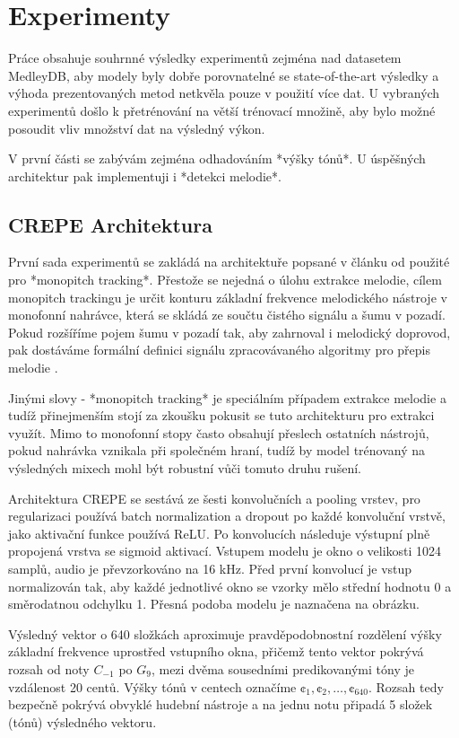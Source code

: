\chapter{Experimenty}

Práce obsahuje souhrnné výsledky experimentů zejména nad datasetem MedleyDB, aby modely byly dobře porovnatelné se state-of-the-art výsledky a výhoda prezentovaných metod netkvěla pouze v použití více dat. U vybraných experimentů došlo k přetrénování na větší trénovací množině, aby bylo možné posoudit vliv množství dat na výsledný výkon. 

V první části se zabývám zejména odhadováním *výšky tónů*. U úspěšných architektur pak implementuji i *detekci melodie*.

\section{CREPE Architektura}

První sada experimentů se zakládá na architektuře popsané v článku od \cite{Kim2018} použité pro *monopitch tracking*. Přestože se nejedná o úlohu extrakce melodie, cílem monopitch trackingu je určit konturu základní frekvence melodického nástroje v monofonní nahrávce, která se skládá ze součtu čistého signálu a šumu v pozadí. Pokud rozšíříme pojem šumu v pozadí tak, aby zahrnoval i melodický doprovod, pak dostáváme formální definici signálu zpracovávaného algoritmy pro přepis melodie \cite{Salamon2014}.

Jinými slovy - *monopitch tracking* je speciálním případem extrakce melodie a tudíž přinejmenším stojí za zkoušku pokusit se tuto architekturu pro extrakci využít. Mimo to monofonní stopy často obsahují přeslech ostatních nástrojů, pokud nahrávka vznikala při společném hraní, tudíž by model trénovaný na výsledných mixech mohl být robustní vůči tomuto druhu rušení. 

Architektura CREPE se sestává ze šesti konvolučních a pooling vrstev, pro regularizaci používá batch normalization a dropout po každé konvoluční vrstvě, jako aktivační funkce používá ReLU. Po konvolucích následuje výstupní plně propojená vrstva se sigmoid aktivací. Vstupem modelu je okno o velikosti 1024 samplů, audio je převzorkováno na 16 kHz. Před první konvolucí je vstup normalizován tak, aby každé jednotlivé okno se vzorky mělo střední hodnotu 0 a směrodatnou odchylku 1. Přesná podoba modelu je naznačena na obrázku.

Výsledný vektor o 640 složkách aproximuje pravděpodobnostní rozdělení výšky základní frekvence uprostřed vstupního okna, přičemž tento vektor pokrývá rozsah od noty $C_{-1}$ po $G_{9}$, mezi dvěma sousedními predikovanými tóny je vzdálenost 20 centů. Výšky tónů v centech označíme $\cent_1, \cent_2, \dots, \cent_{640}$. Rozsah tedy bezpečně pokrývá obvyklé hudební nástroje a na jednu notu připadá 5 složek (tónů) výsledného vektoru.

